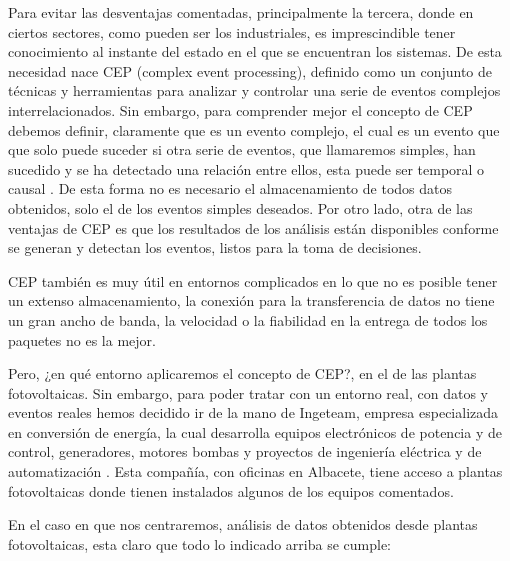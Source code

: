 \documentclass[a4paper]{article}
\begin{document}
Para evitar las desventajas comentadas, principalmente la tercera, donde en ciertos sectores, como pueden ser los industriales, es imprescindible tener conocimiento al instante del estado en el que se encuentran los sistemas. De esta necesidad nace CEP (complex event processing), definido como un conjunto de técnicas y herramientas para analizar y controlar una serie de eventos complejos interrelacionados. Sin embargo, para comprender mejor el concepto de CEP debemos definir, claramente que es un evento complejo, el cual es un evento que que solo puede suceder si otra serie de eventos, que llamaremos simples, han sucedido y se ha detectado una relación entre ellos, esta puede ser temporal o causal \cite{libro introduccion cep}. De esta forma no es necesario el almacenamiento de todos datos obtenidos, solo el de los eventos simples deseados. Por otro lado, otra de las ventajas de CEP es que los resultados de los análisis están disponibles conforme se generan y detectan los eventos, listos para la toma de decisiones.

CEP también es muy útil en entornos complicados en lo que no es posible tener un extenso almacenamiento, la conexión para la transferencia de datos no tiene un gran ancho de banda, la velocidad o la fiabilidad en la entrega de todos los paquetes no es la mejor.

Pero, ¿en qué entorno aplicaremos el concepto de CEP?, en el de las plantas fotovoltaicas. Sin embargo, para poder tratar con un entorno real, con datos y eventos reales hemos decidido ir de la mano de Ingeteam, empresa especializada en conversión de energía, la cual desarrolla equipos electrónicos de potencia y de control, generadores, motores bombas y proyectos de ingeniería eléctrica y de automatización \cite{webIngeteam}. Esta compañía, con oficinas en Albacete, tiene acceso a plantas fotovoltaicas donde tienen instalados algunos de los equipos comentados.

En el caso en que nos centraremos, análisis de datos obtenidos desde plantas fotovoltaicas, esta claro que todo lo indicado arriba se cumple:
\end{document}
